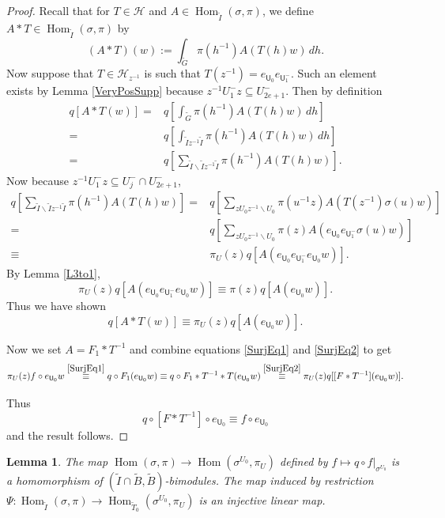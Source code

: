 \documentclass[10pt, letterpaper]{amsart}
\theoremstyle{plain}
\newtheorem{Lem}[equation]{Lemma}
\theoremstyle{definition}
\numberwithin{equation}{section}
\newcommand{\Gt}{\widetilde{G}}
\newcommand{\It}{\widetilde{I}}
\newcommand{\Tt}{\widetilde{T}}
\newcommand{\Hom}{\operatorname{Hom}}
\newcommand{\Hcal}{\mathcal{H}}
\newcommand{\Uf}{\mathsf{U}}
\begin{document}
\begin{proof}
	Recall that for $T\in \Hcal$ and $A\in \Hom_{\It}(\sigma,\pi)$, we define $A*T\in\Hom_{\It}(\sigma,\pi)$ by
    \[
    (A*T)(w):=\int_{\Gt}\pi(h^{-1})A(T(h)w)\,dh.
    \]
    Now suppose that $T\in \Hcal_{z^{-1}}$ is such that $T(z^{-1})=e_{{\Uf}_{0}}e_{{\Uf}^{-}_{1}}$. Such an element exists by Lemma \ref{VeryPosSupp} because $z^{-1}U^{-}_{1}z\subseteq U^{-}_{2e+1}$. Then by definition 
	\begin{align*}
		q[A*T(w)] =&q[ \int_{\Gt}\pi(h^{-1})A(T(h)w)\,dh]\\
		=& q[\int_{\It z^{-1}\It}\pi(h^{-1})A(T(h)w)\,dh]\\
		=& q[\sum_{\It\backslash \It z^{-1}\It}\pi(h^{-1})A(T(h)w)].
	\end{align*}
	Now because $z^{-1}U^{-}_{1}z\subseteq U^{-}_{j}\cap U^{-}_{2e+1}$,
	\begin{align*}
		q[\sum_{\It\backslash \It z^{-1}\It}\pi(h^{-1})A(T(h)w)] =& q[\sum_{zU_{0}z^{-1}\backslash U_{0}}\pi(u^{-1}z)A(T(z^{-1})\sigma(u)w)]\\
		=& q[\sum_{zU_{0}z^{-1}\backslash U_{0}}\pi(z)A(e_{{\Uf}_{0}}e_{{\Uf}^{-}_{1}}\sigma(u)w)]\\
		\equiv&\pi_{U}(z)q[A(e_{{\Uf}_{0}}e_{{\Uf}^{-}_{1}}e_{{\Uf}_{0}}w)].
	\end{align*}
	By Lemma \ref{L3to1},
	\begin{equation*}
	\pi_{U}(z)q[A(e_{{\Uf}_{0}}e_{{\Uf}^{-}_{1}}e_{{\Uf}_{0}}w)]\equiv\pi(z)q[A(e_{{\Uf}_{0}}w)].
	\end{equation*}
	Thus we have shown
	\begin{equation}\label{SurjEq2}
		q[A*T(w)] \equiv\pi_{U}(z)q[A(e_{{\Uf}_{0}}w)].
	\end{equation}
	
	Now we set $A=F_1*T^{-1}$ and combine equations \eqref{SurjEq1} and \eqref{SurjEq2} to get 
    \begin{equation*}
		\pi_{U}(z)f \circ e_{{\Uf}_{0}}w\stackrel{\eqref{SurjEq1}}{\equiv}q\circ F_1(e_{{\Uf}_{0}}w)\equiv q\circ F_1*T^{-1}*T(e_{{\Uf}_{0}}w)\stackrel{\eqref{SurjEq2}}{\equiv}\pi_{U}(z)q[[F*T^{-1}](e_{{\Uf}_{0}}w)].
	\end{equation*}
	
	Thus 
	\begin{equation*}
		q\circ [F*T^{-1}]\circ e_{{\Uf}_{0}}\equiv f\circ e_{{\Uf}_{0}}
	\end{equation*}
	and the result follows.
\end{proof}

\begin{Lem}\label{LemInj}
	The map $\Hom(\sigma,\pi)\rightarrow \Hom(\sigma^{U_{0}},\pi_{U})$ defined by $f\mapsto q\circ f|_{\sigma^{U_{0}}}$ is a homomorphism of $(\It\cap \widetilde{B},\widetilde{B})$-bimodules. The map induced by restriction $\Psi:\Hom_{\It}(\sigma,\pi)\rightarrow \Hom_{\Tt_{0}}(\sigma^{U_{0}},\pi_{U})$ is an injective linear map.
\end{Lem}
\end{document}
